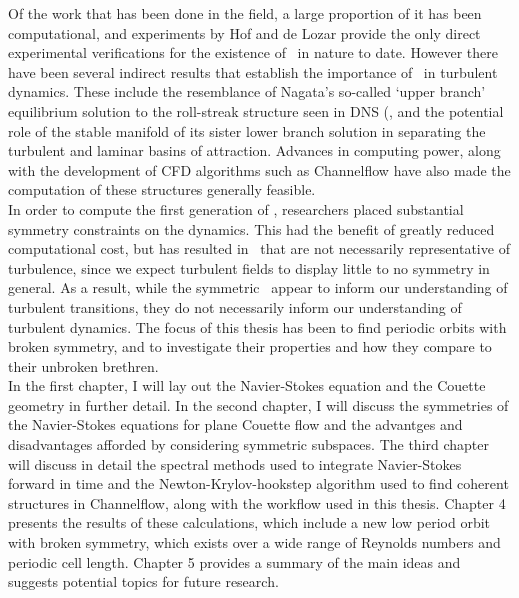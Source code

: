 Of the work that has been done in the field, a large proportion of it has been computational, and experiments by Hof and de Lozar  provide the only direct experimental verifications for the existence of \ecs~in nature to date. However there have been several indirect results that establish the importance of \ecs\  in turbulent dynamics. These include the resemblance of Nagata's so-called `upper branch' equilibrium solution to the roll-streak structure seen in DNS (, and the potential role of the stable manifold of its sister lower branch solution in separating the turbulent and laminar basins of attraction. Advances in computing power, along with the development of CFD algorithms such as Channelflow have also made the computation of these structures generally feasible.\\

 In order to compute the first generation of \ecs, researchers placed substantial symmetry constraints on the dynamics. This had the benefit of greatly reduced computational cost, but has resulted in \ecs\ that are not necessarily representative of turbulence, since we expect turbulent fields to display little to no symmetry in general. As a result, while the symmetric \ecs\ 	appear to inform our understanding of turbulent transitions, they do not necessarily inform our understanding of turbulent dynamics. The focus of this thesis has been to find periodic orbits with broken symmetry, and to investigate their properties and how they compare to their unbroken brethren.\\ 
 




In the first chapter, I will lay out the Navier-Stokes equation and the Couette geometry  in further detail. In the second chapter, I will discuss the symmetries of the Navier-Stokes equations for plane Couette flow and the advantges and disadvantages afforded by considering symmetric subspaces. The third chapter will discuss in detail the spectral methods used to integrate Navier-Stokes forward in time and the Newton-Krylov-hookstep algorithm used to find coherent structures in Channelflow, along with the workflow used in this thesis. Chapter 4 presents the results of these calculations, which include a new low period orbit with broken symmetry, which exists over a wide range of Reynolds numbers and periodic cell length. Chapter 5 provides a summary of the main ideas and suggests potential topics for future research. 
 
 
 
 
 